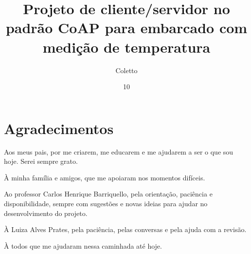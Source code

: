 \documentclass[tg]{mdtufsm}
\title{Projeto de cliente/servidor no padrão CoAP para embarcado com medição de temperatura}
\author{Coletto}{Mikael Marin}
\institute{Centro de Tecnologia}
\date{10}{Dezembro}{2015}
\begin{document}
\maketitle

\restoregeometry


\makeapprove


\chapter*{Agradecimentos}
Aos meus pais, por me criarem, me educarem e me ajudarem a ser o que sou hoje. Serei sempre grato.

\`A minha família e amigos, que me apoiaram nos momentos difíceis.

Ao professor Carlos Henrique Barriquello, pela orientação, paciência e disponibilidade, sempre com sugestões e novas ideias para ajudar no desenvolvimento do projeto.

\`A Luiza Alves Prates, pela paciência, pelas conversas e pela ajuda com a revisão.

\`A todos que me ajudaram nessa caminhada até hoje.
\end{document}
